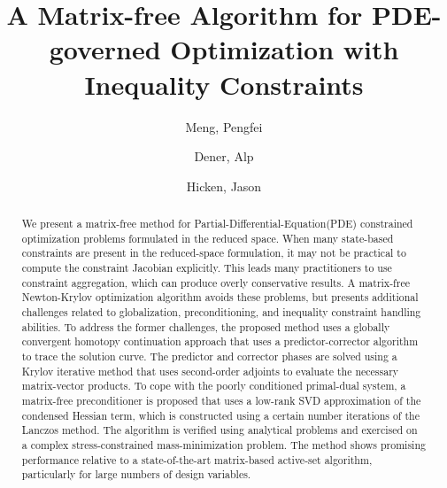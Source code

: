\documentclass{article}
\date{}
\theoremstyle{definition}
\begin{document}
\title{A Matrix-free Algorithm for PDE-governed Optimization with Inequality Constraints}
\author{
  Meng, Pengfei\\
  \and
  Dener, Alp\\
  \and 
  Hicken, Jason
}
\maketitle
\begin{abstract}
We present a matrix-free method for Partial-Differential-Equation(PDE) constrained optimization problems formulated in the reduced space. When many state-based constraints are present in the reduced-space formulation, it may not be practical to compute the constraint Jacobian explicitly.  This leads many practitioners to use constraint aggregation, which can produce overly conservative results.  A matrix-free Newton-Krylov optimization algorithm avoids these problems, but presents additional challenges related to globalization, preconditioning, and inequality constraint handling abilities. To address the former challenges, the proposed method uses a globally convergent homotopy continuation approach that uses a predictor-corrector algorithm to trace the solution curve. The predictor and corrector phases are solved using a Krylov iterative method that uses second-order adjoints to evaluate the necessary matrix-vector products. To cope with the poorly conditioned primal-dual system, a matrix-free preconditioner is proposed that uses a low-rank SVD approximation of the condensed Hessian term,  which is constructed using a certain number iterations of the Lanczos method. The algorithm is verified using analytical problems and exercised on a complex stress-constrained mass-minimization problem.  The method shows promising performance relative to a state-of-the-art matrix-based active-set algorithm, particularly for large numbers of design variables.
\end{abstract}
\end{document}
